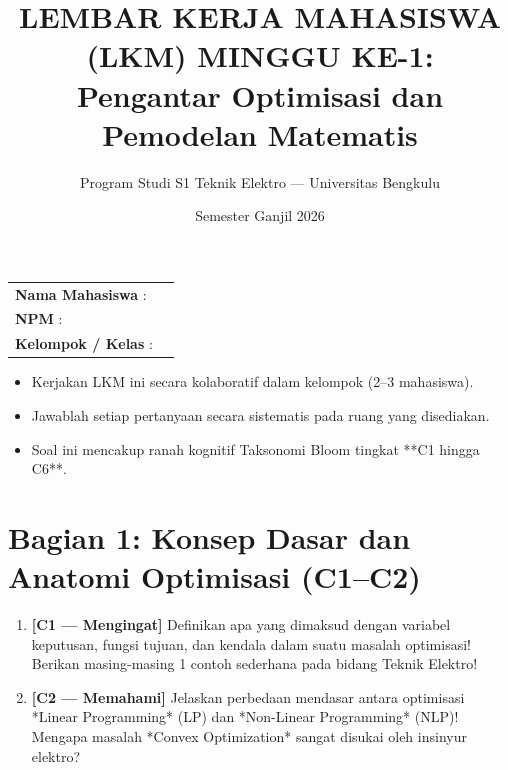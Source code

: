 \documentclass[11pt,a4paper]{article}
\title{\vspace{-1cm}\textbf{LEMBAR KERJA MAHASISWA (LKM) MINGGU KE-1:}\\Pengantar Optimisasi dan Pemodelan Matematis}
\author{Program Studi S1 Teknik Elektro --- Universitas Bengkulu}
\date{Semester Ganjil 2026}
\begin{document}
\maketitle

\begin{tcolorbox}[colback=unibblue!5,colframe=unibblue,title=\textbf{Identitas Mahasiswa dan Instruksi}]
\begin{tabular}{ll}
\textbf{Nama Mahasiswa} : & \hrulefill\hspace{6cm} \\
\textbf{NPM} : & \hrulefill\hspace{6cm} \\
\textbf{Kelompok / Kelas} : & \hrulefill\hspace{6cm} \\
\end{tabular}
\vspace{0.2cm}
\begin{itemize}[leftmargin=*]
    \item Kerjakan LKM ini secara kolaboratif dalam kelompok (2--3 mahasiswa).
    \item Jawablah setiap pertanyaan secara sistematis pada ruang yang disediakan.
    \item Soal ini mencakup ranah kognitif Taksonomi Bloom tingkat **C1 hingga C6**.
\end{itemize}
\end{tcolorbox}

\vspace{0.3cm}

\section*{Bagian 1: Konsep Dasar dan Anatomi Optimisasi (C1--C2)}

\begin{enumerate}[label=\textbf{Soal \arabic*:}, leftmargin=*]
    \item \textbf{[C1 --- Mengingat]} Definikan apa yang dimaksud dengan variabel keputusan, fungsi tujuan, dan kendala dalam suatu masalah optimisasi! Berikan masing-masing 1 contoh sederhana pada bidang Teknik Elektro!
    
    \begin{tcolorbox}[colback=white,colframe=gray!50,height=3.5cm,title=Ruang Jawaban Soal 1]
    \end{tcolorbox}

    \item \textbf{[C2 --- Memahami]} Jelaskan perbedaan mendasar antara optimisasi *Linear Programming* (LP) dan *Non-Linear Programming* (NLP)! Mengapa masalah *Convex Optimization* sangat disukai oleh insinyur elektro?
    
    \begin{tcolorbox}[colback=white,colframe=gray!50,height=3.5cm,title=Ruang Jawaban Soal 2]
    \end{tcolorbox}
\end{enumerate}
\end{document}
